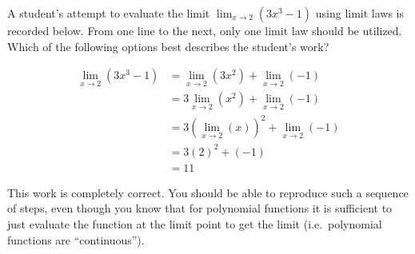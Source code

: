 \documentclass{ximera}
\author{Steven Gubkin}
\begin{document}
\begin{exercise}

	A student's attempt to evaluate the limit $\lim_{x \to 2} \left( 3x^3-1 \right)$ using limit laws is recorded below.  From one line to the next, only one limit law should be utilized.  Which of the following options best describes the student's work?
	
	\begin{align*}
		\lim_{x \to 2} \left( 3x^3-1 \right) &= \lim_{x \to 2} \left( 3x^2\right) + \lim_{x \to 2} \left( -1 \right)\\
		&= 3 \lim_{x \to 2} \left( x^2\right) + \lim_{x \to 2} \left( -1 \right)\\
		&= 3 \left( \lim_{x \to 2} \left( x\right) \right)^2 + \lim_{x \to 2} \left( -1 \right)\\
		&=3 \left( 2 \right)^2 + \left( -1 \right)\\
		&= 11
	\end{align*}
	
	\begin{multipleChoice}
	\end{multipleChoice}
	
	\begin{feedback}
	  This work is completely correct.  You should be able to
          reproduce such a sequence of steps, even though you know
          that for polynomial functions it is sufficient to just
          evaluate the function at the limit point to get the limit
          (i.e.\ polynomial functions are ``continuous'').
	\end{feedback}
	
\end{exercise}
\end{document}
